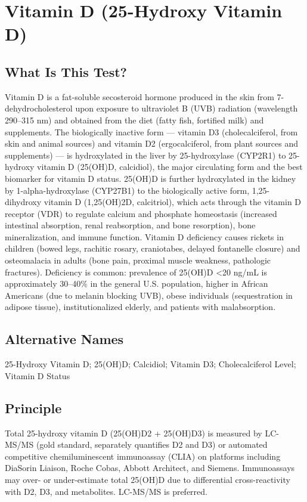\chapter{Vitamin D (25-Hydroxy Vitamin D)}
\section*{What Is This Test?}
Vitamin D is a fat-soluble secosteroid hormone produced in the skin from 7-dehydrocholesterol upon exposure to ultraviolet B (UVB) radiation (wavelength 290--315 nm) and obtained from the diet (fatty fish, fortified milk) and supplements. The biologically inactive form --- vitamin D3 (cholecalciferol, from skin and animal sources) and vitamin D2 (ergocalciferol, from plant sources and supplements) --- is hydroxylated in the liver by 25-hydroxylase (CYP2R1) to 25-hydroxy vitamin D (25(OH)D, calcidiol), the major circulating form and the best biomarker for vitamin D status. 25(OH)D is further hydroxylated in the kidney by 1-alpha-hydroxylase (CYP27B1) to the biologically active form, 1,25-dihydroxy vitamin D (1,25(OH)2D, calcitriol), which acts through the vitamin D receptor (VDR) to regulate calcium and phosphate homeostasis (increased intestinal absorption, renal reabsorption, and bone resorption), bone mineralization, and immune function. Vitamin D deficiency causes rickets in children (bowed legs, rachitic rosary, craniotabes, delayed fontanelle closure) and osteomalacia in adults (bone pain, proximal muscle weakness, pathologic fractures). Deficiency is common: prevalence of 25(OH)D <20 ng/mL is approximately 30--40\% in the general U.S. population, higher in African Americans (due to melanin blocking UVB), obese individuals (sequestration in adipose tissue), institutionalized elderly, and patients with malabsorption.
\section*{Alternative Names}
25-Hydroxy Vitamin D; 25(OH)D; Calcidiol; Vitamin D3; Cholecalciferol Level; Vitamin D Status
\section*{Principle}
Total 25-hydroxy vitamin D (25(OH)D2 + 25(OH)D3) is measured by LC-MS/MS (gold standard, separately quantifies D2 and D3) or automated competitive chemiluminescent immunoassay (CLIA) on platforms including DiaSorin Liaison, Roche Cobas, Abbott Architect, and Siemens. Immunoassays may over- or under-estimate total 25(OH)D due to differential cross-reactivity with D2, D3, and metabolites. LC-MS/MS is preferred.
